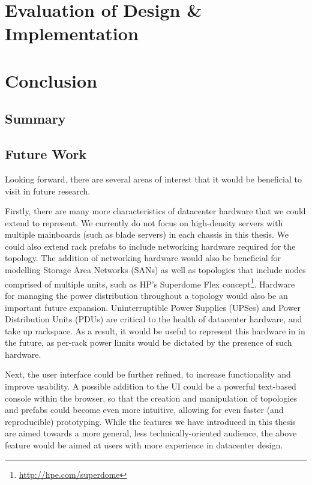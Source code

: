 \documentclass[11pt]{article}
\begin{document}
\newpage

\section{Evaluation of Design \& Implementation} \label{sec:evaluation}

\newpage

\section{Conclusion} \label{sec:conclusion}
	\subsection{Summary}
	
	\subsection{Future Work} \label{sec:future-work}
	Looking forward, there are several areas of interest that it would be beneficial to visit in future research.

	Firstly, there are many more characteristics of datacenter hardware that we could extend \opendc{} to represent. 
	We currently do not focus on high-density servers with multiple mainboards (such as blade servers) in each chassis in this thesis. 
	We could also extend rack prefabs to include networking hardware required for the topology. 
	The addition of networking hardware would also be beneficial for modelling Storage Area Networks (SANs) as well as topologies that include nodes comprised of multiple units, such as HP's Superdome Flex concept\footnote{\url{http://hpe.com/superdome}}.
	Hardware for managing the power distribution throughout a topology would also be an important future expansion.
	Uninterruptible Power Supplies (UPSes) and Power Distribution Units (PDUs) are critical to the health of datacenter hardware, and take up rackspace.
	As a result, it would be useful to represent this hardware in \opendc{} in the future, as per-rack power limits would be dictated by the presence of such hardware.

	Next, the \opendc{} user interface could be further refined, to increase functionality and improve usability.
	A possible addition to the UI could be a powerful text-based console within the browser, so that the creation and manipulation of topologies and prefabs could become even more intuitive, allowing for even faster (and reproducible) prototyping.
	While the features we have introduced in this thesis are aimed towards a more general, less technically-oriented audience, the above feature would be aimed at users with more experience in datacenter design.
\end{document}
